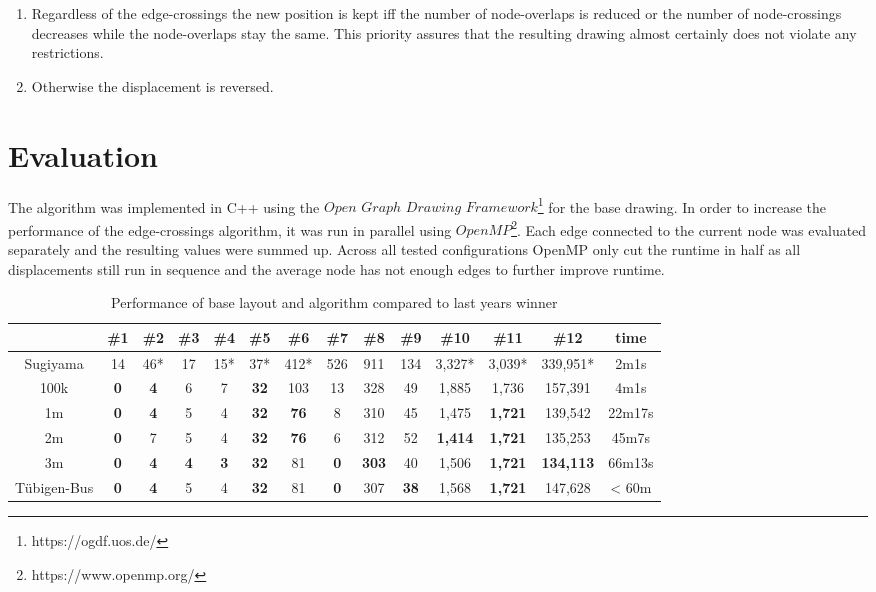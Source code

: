\documentclass[]{llncs}
\begin{document}
\begin{enumerate}[start=0]
\begin{enumerate}
        \item Regardless of the edge-crossings the new position is kept iff the number of node-overlaps is reduced or the number of node-crossings decreases while the node-overlaps stay the same. This priority assures that the resulting drawing almost certainly does not violate any restrictions.
        \item Otherwise the displacement is reversed.
    \end{enumerate}
\end{enumerate}

\section{Evaluation}
The algorithm was implemented in C++ using the $Open$ $Graph$ $Drawing$ $Framework$\footnote{https://ogdf.uos.de/} for the base drawing. In order to increase the performance of the edge-crossings algorithm, it was run in parallel using $OpenMP$\footnote{https://www.openmp.org/}. Each edge connected to the current node was evaluated separately and the resulting values were summed up.  Across all tested configurations OpenMP only cut the runtime in half as all displacements still run in sequence and the average node has not enough edges to further improve runtime.

\begin{table}
\centering
\caption{Performance of base layout and algorithm compared to last years winner}
\begin{tabular}{|c|c|c|c|c|c|c|c|c|c|c|c|c|c|}
	\hline 
	& \#1 & \#2 & \#3 & \#4 & \#5 & \#6 & \#7 & \#8 & \#9 & \#10 & \#11 & \#12 & time\\
	\hline 
    Sugiyama & 14 & 46* & 17 & 15* & 37* & 412* & 526 & 911 & 134 & 3,327* & 3,039* & 339,951* & 2m1s \\  
	100k & \textbf{0} & \textbf{4} & 6 & 7 & \textbf{32} & 103 & 13 & 328 & 49 & 1,885 & 1,736 & 157,391 & 4m1s \\
	1m & \textbf{0} & \textbf{4} & 5 & 4 & \textbf{32} & \textbf{76} & 8 & 310 & 45 & 1,475 & \textbf{1,721} & 139,542 & 22m17s \\
	2m & \textbf{0} & 7 & 5 & 4 & \textbf{32} & \textbf{76} & 6 & 312 & 52 & \textbf{1,414} & \textbf{1,721} & 135,253 & 45m7s \\
	3m & \textbf{0} & \textbf{4} & \textbf{4} & \textbf{3} & \textbf{32} & 81 & \textbf{0} & \textbf{303} & 40 & 1,506 & \textbf{1,721} & \textbf{134,113} & 66m13s \\
	Tübigen-Bus & \textbf{0} & \textbf{4} & 5 & 4 & \textbf{32} & 81 & \textbf{0} & 307 & \textbf{38} & 1,568 & \textbf{1,721} & 147,628 & < 60m \\
	\hline 
\end{tabular}
\label{best-res}
\end{table}
\end{document}

